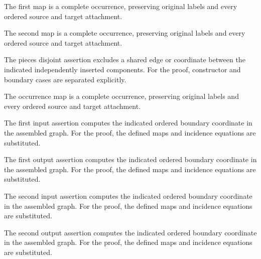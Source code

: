 The first map is a complete occurrence, preserving original labels and every ordered source and target attachment.
\par{}

The second map is a complete occurrence, preserving original labels and every ordered source and target attachment.
\par{}

The pieces disjoint assertion excludes a shared edge or coordinate between the indicated independently inserted components.
For the proof, constructor and boundary cases are separated explicitly.
\par{}

The occurrence map is a complete occurrence, preserving original labels and every ordered source and target attachment.
\par{}

The first input assertion computes the indicated ordered boundary coordinate in the assembled graph.
For the proof, the defined maps and incidence equations are substituted.
\par{}

The first output assertion computes the indicated ordered boundary coordinate in the assembled graph.
For the proof, the defined maps and incidence equations are substituted.
\par{}

The second input assertion computes the indicated ordered boundary coordinate in the assembled graph.
For the proof, the defined maps and incidence equations are substituted.
\par{}

The second output assertion computes the indicated ordered boundary coordinate in the assembled graph.
For the proof, the defined maps and incidence equations are substituted.
\par{}

